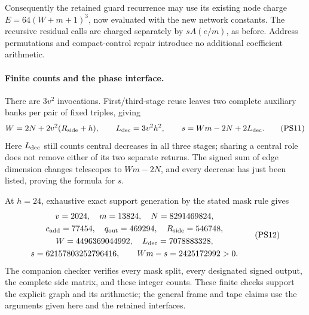 Consequently the retained guard recurrence may use its existing node
charge $E=64(W+m+1)^3$, now evaluated with the new network constants.
The recursive residual calls are charged separately by $sA(e/m)$,
as before.  Address permutations and compact-control repair introduce
no additional coefficient arithmetic.

\paragraph{Finite counts and the phase interface.}
There are $3v^2$ invocations.  First/third-stage reuse leaves two complete
auxiliary banks per pair of fixed triples, giving
\[
 W=2N+2v^2(R_{\rm side}+h),\qquad
 L_{\rm dec}=3v^2h^2,\qquad
 s=Wm-2N+2L_{\rm dec}.                                         \tag{PS11}
\]
Here $L_{\rm dec}$ still counts central decreases in all three stages;
sharing a central role does not remove either of its two separate returns.
The signed sum of edge dimension changes telescopes to $Wm-2N$, and
every decrease has just been listed, proving the formula for $s$.

At $h=24$, exhaustive exact support generation by the stated mask rule gives
\[
\begin{gathered}
 v=2024,\quad m=13824,\quad N=8291469824,\\
 c_{\rm add}=77454,\quad q_{\rm out}=469294,\quad
 R_{\rm side}=546748,\\
 W=4496369044992,\quad L_{\rm dec}=7078883328,\\
 s=62157803252796416,\qquad Wm-s=2425172992>0.
\end{gathered}                                                  \tag{PS12}
\]
The companion checker verifies every mask split, every designated signed
output, the complete side matrix, and these integer counts.  These finite
checks support the explicit graph and its arithmetic; the general frame
and tape claims use the arguments given here and the retained interfaces.

